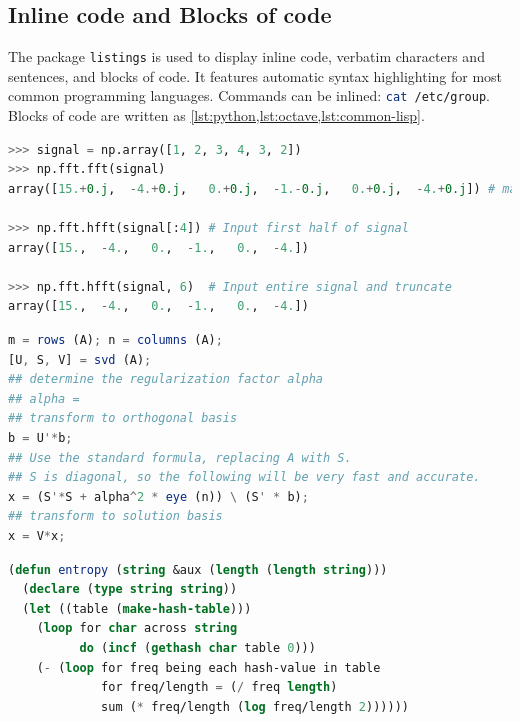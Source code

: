 \subsection{Inline code and Blocks of code}
The package \lstinline{listings} \cite{listings} is used to display inline
code, verbatim characters and sentences, and blocks of code. It features
automatic syntax highlighting for most common programming languages.  Commands
can be inlined: \lstinline[style=mystyle,language=sh]{cat /etc/group}.  Blocks
of code are written as \cref{lst:python,lst:octave,lst:common-lisp}.

\begin{minipage}{\linewidth}
\begin{lstlisting}[language=Python,
                   caption={Python code sample \cite{numpy-hfft}.},
                   label={lst:python}]
>>> signal = np.array([1, 2, 3, 4, 3, 2])
>>> np.fft.fft(signal)
array([15.+0.j,  -4.+0.j,   0.+0.j,  -1.-0.j,   0.+0.j,  -4.+0.j]) # may vary

>>> np.fft.hfft(signal[:4]) # Input first half of signal
array([15.,  -4.,   0.,  -1.,   0.,  -4.])

>>> np.fft.hfft(signal, 6)  # Input entire signal and truncate
array([15.,  -4.,   0.,  -1.,   0.,  -4.])
\end{lstlisting} \end{minipage}

\begin{minipage}{\linewidth}
\begin{lstlisting}[language=Octave,
                   caption={Octave code sample \cite{octave-example}.},
                   label={lst:octave}]
m = rows (A); n = columns (A);
[U, S, V] = svd (A);
## determine the regularization factor alpha
## alpha =
## transform to orthogonal basis
b = U'*b;
## Use the standard formula, replacing A with S.
## S is diagonal, so the following will be very fast and accurate.
x = (S'*S + alpha^2 * eye (n)) \ (S' * b);
## transform to solution basis
x = V*x;
\end{lstlisting} \end{minipage}

\begin{minipage}{\linewidth}
\begin{lstlisting}[language=Lisp,
                   caption={Common Lisp code sample
                            \cite{common-lisp-example}.},
                   label={lst:common-lisp}]
(defun entropy (string &aux (length (length string)))
  (declare (type string string))
  (let ((table (make-hash-table)))
    (loop for char across string
          do (incf (gethash char table 0)))
    (- (loop for freq being each hash-value in table
             for freq/length = (/ freq length)
             sum (* freq/length (log freq/length 2))))))
\end{lstlisting} \end{minipage}

